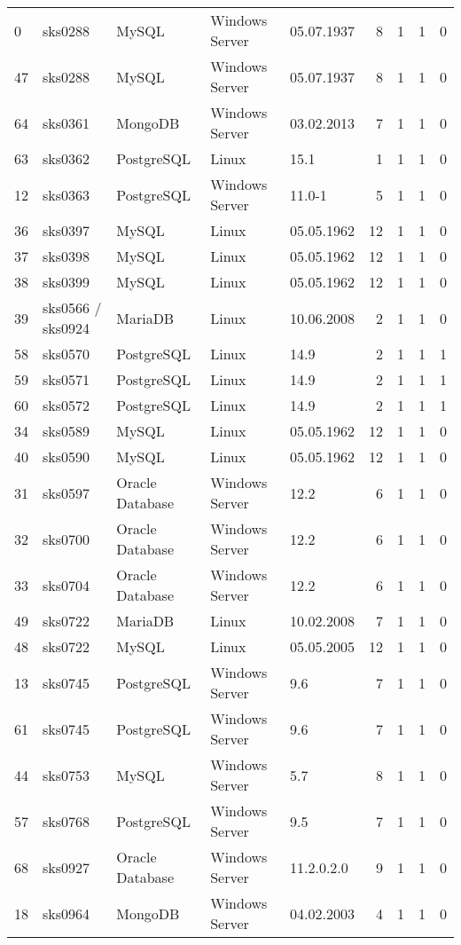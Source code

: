 \begin{longtable}[H]{lllllrrrr}
0 & sks0288 & MySQL & Windows Server & 05.07.1937 & 8 & 1 & 1 & 0 \\
47 & sks0288 & MySQL & Windows Server & 05.07.1937 & 8 & 1 & 1 & 0 \\
64 & sks0361 & MongoDB & Windows Server & 03.02.2013 & 7 & 1 & 1 & 0 \\
63 & sks0362 & PostgreSQL & Linux & 15.1 & 1 & 1 & 1 & 0 \\
12 & sks0363 & PostgreSQL & Windows Server & 11.0-1 & 5 & 1 & 1 & 0 \\
36 & sks0397 & MySQL & Linux & 05.05.1962 & 12 & 1 & 1 & 0 \\
37 & sks0398 & MySQL & Linux & 05.05.1962 & 12 & 1 & 1 & 0 \\
38 & sks0399 & MySQL & Linux & 05.05.1962 & 12 & 1 & 1 & 0 \\
39 & sks0566 / sks0924 & MariaDB & Linux & 10.06.2008 & 2 & 1 & 1 & 0 \\
58 & sks0570 & PostgreSQL & Linux & 14.9 & 2 & 1 & 1 & 1 \\
59 & sks0571 & PostgreSQL & Linux & 14.9 & 2 & 1 & 1 & 1 \\
60 & sks0572 & PostgreSQL & Linux & 14.9 & 2 & 1 & 1 & 1 \\
34 & sks0589 & MySQL & Linux & 05.05.1962 & 12 & 1 & 1 & 0 \\
40 & sks0590 & MySQL & Linux & 05.05.1962 & 12 & 1 & 1 & 0 \\
31 & sks0597 & Oracle Database & Windows Server & 12.2 & 6 & 1 & 1 & 0 \\
32 & sks0700 & Oracle Database & Windows Server & 12.2 & 6 & 1 & 1 & 0 \\
33 & sks0704 & Oracle Database & Windows Server & 12.2 & 6 & 1 & 1 & 0 \\
49 & sks0722 & MariaDB & Linux & 10.02.2008 & 7 & 1 & 1 & 0 \\
48 & sks0722 & MySQL & Linux & 05.05.2005 & 12 & 1 & 1 & 0 \\
13 & sks0745 & PostgreSQL & Windows Server & 9.6 & 7 & 1 & 1 & 0 \\
61 & sks0745 & PostgreSQL & Windows Server & 9.6 & 7 & 1 & 1 & 0 \\
44 & sks0753 & MySQL & Windows Server & 5.7 & 8 & 1 & 1 & 0 \\
57 & sks0768 & PostgreSQL & Windows Server & 9.5 & 7 & 1 & 1 & 0 \\
68 & sks0927 & Oracle Database & Windows Server & 11.2.0.2.0 & 9 & 1 & 1 & 0 \\
18 & sks0964 & MongoDB & Windows Server & 04.02.2003 & 4 & 1 & 1 & 0 \\

\end{longtable}
